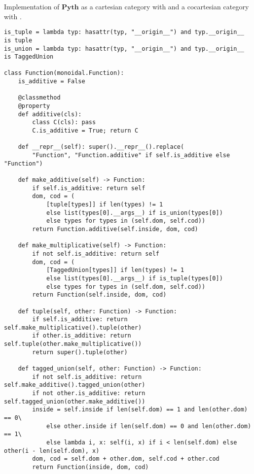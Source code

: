 \begin{python}\label{listing:python-co-cartesian}
{\normalfont Implementation of $\mathbf{Pyth}$ as a cartesian category with  and a cocartesian category with .}

\begin{verbatim}
is_tuple = lambda typ: hasattr(typ, "__origin__") and typ.__origin__ is tuple
is_union = lambda typ: hasattr(typ, "__origin__") and typ.__origin__ is TaggedUnion

class Function(monoidal.Function):
    is_additive = False

    @classmethod
    @property
    def additive(cls):
        class C(cls): pass
        C.is_additive = True; return C

    def __repr__(self): super().__repr__().replace(
        "Function", "Function.additive" if self.is_additive else "Function")

    def make_additive(self) -> Function:
        if self.is_additive: return self
        dom, cod = (
            [tuple[types]] if len(types) != 1
            else list(types[0].__args__) if is_union(types[0])
            else types for types in (self.dom, self.cod))
        return Function.additive(self.inside, dom, cod)

    def make_multiplicative(self) -> Function:
        if not self.is_additive: return self
        dom, cod = (
            [TaggedUnion[types]] if len(types) != 1
            else list(types[0].__args__) if is_tuple(types[0])
            else types for types in (self.dom, self.cod))
        return Function(self.inside, dom, cod)

    def tuple(self, other: Function) -> Function:
        if self.is_additive: return self.make_multiplicative().tuple(other)
        if other.is_additive: return self.tuple(other.make_multiplicative())
        return super().tuple(other)

    def tagged_union(self, other: Function) -> Function:
        if not self.is_additive: return self.make_additive().tagged_union(other)
        if not other.is_additive: return self.tagged_union(other.make_additive())
        inside = self.inside if len(self.dom) == 1 and len(other.dom) == 0\
            else other.inside if len(self.dom) == 0 and len(other.dom) == 1\
            else lambda i, x: self(i, x) if i < len(self.dom) else other(i - len(self.dom), x)
        dom, cod = self.dom + other.dom, self.cod + other.cod
        return Function(inside, dom, cod)


\end{verbatim}
\end{python}
